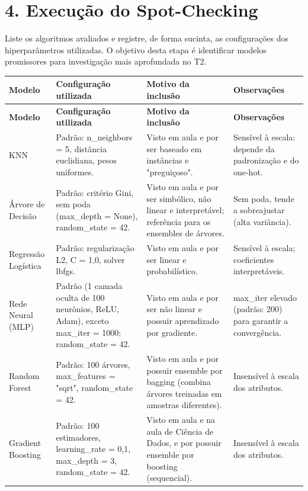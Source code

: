 \documentclass[11pt,letterpaper]{article}
\begin{document}
\clearpage
\section*{4. Execução do Spot-Checking}

Liste os algoritmos avaliados e registre, de forma sucinta, as configurações dos hiperparâmetros utilizadas. O objetivo desta etapa é identificar modelos promissores para investigação mais aprofundada no T2.

\begingroup
\small
\begin{longtable}{|L{72.460pt}|L{135.900pt}|L{126.140pt}|L{111.500pt}|}
\hline
\textbf{Modelo} & \textbf{Configuração utilizada} & \textbf{Motivo da inclusão} & \textbf{Observações} \\ \hline
\endfirsthead
\hline
\textbf{Modelo} & \textbf{Configuração utilizada} & \textbf{Motivo da inclusão} & \textbf{Observações} \\ \hline
\endhead
KNN & Padrão: n\_neighbors = 5, distância euclidiana, pesos uniformes. & Visto em aula e por ser baseado em instâncias e "preguiçoso". & Sensível à escala: depende da padronização e do one-hot. \\ \hline
Árvore de Decisão & Padrão: critério Gini, sem poda (max\_depth = None), random\_state = 42. & Visto em aula e por ser simbólico, não linear e interpretável; referência para os ensembles de árvores. & Sem poda, tende a sobreajustar (alta variância). \\ \hline
Regressão Logística & Padrão: regularização L2, C = 1,0, solver lbfgs. & Visto em aula e por ser linear e probabilístico. & Sensível à escala; coeficientes interpretáveis. \\ \hline
Rede Neural (MLP) & Padrão (1 camada oculta de 100 neurônios, ReLU, Adam), exceto max\_iter = 1000; random\_state = 42. & Visto em aula e por ser não linear e possuir aprendizado por gradiente. & max\_iter elevado (padrão: 200) para garantir a convergência. \\ \hline
Random Forest & Padrão: 100 árvores, max\_features = "sqrt", random\_state = 42. & Visto em aula e por possuir ensemble por bagging (combina árvores treinadas em amostras diferentes). & Insensível à escala dos atributos. \\ \hline
Gradient Boosting & Padrão: 100 estimadores, learning\_rate = 0,1, max\_depth = 3, random\_state = 42. & Visto em aula e na aula de Ciência de Dados, e por possuir ensemble por boosting (sequencial). & Insensível à escala dos atributos. \\ \hline
\end{longtable}
\endgroup
\end{document}
